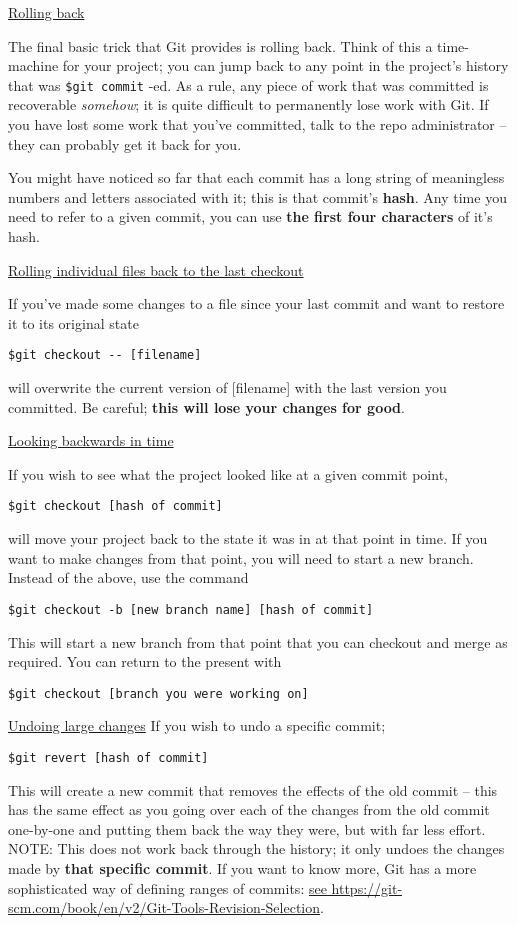 \documentclass[11pt, a4paper, english]{article}
\begin{document}
\underline{Rolling back}

The final basic trick that Git provides is rolling back. Think of this a time-machine for your project; you can jump back to any point in the project’s history that was \verb|$git commit| -ed. As a rule, any piece of work that was committed is recoverable \textit{somehow}; it is quite difficult to permanently lose work with Git. If you have lost some work that you’ve committed, talk to the repo administrator – they can probably get it back for you.

You might have noticed so far that each commit has a long string of meaningless numbers and letters associated with it; this is that commit's \textbf{hash}. Any time you need to refer to a given commit, you can use \textbf{the first four characters} of it's hash.

\underline{Rolling individual files back to the last checkout}

If you’ve made some changes to a file since your last commit and want to restore it to its original state
\begin{verbatim}
$git checkout -- [filename]
\end{verbatim}

will overwrite the current version of [filename] with the last version you committed. Be careful; \textbf{this will lose your changes for good}.

\underline{Looking backwards in time}

If you wish to see what the project looked like at a given commit point,
\begin{verbatim}
$git checkout [hash of commit]
\end{verbatim}
will move your project back to the state it was in at that point in time.
If you want to make changes from that point, you will need to start a new branch. Instead of the above, use the command
\begin{verbatim}
$git checkout -b [new branch name] [hash of commit]
\end{verbatim}
This will start a new branch from that point that you can checkout and merge as required.
You can return to the present with
\begin{verbatim}
$git checkout [branch you were working on]
\end{verbatim}

\underline{Undoing large changes}
If you wish to undo a specific commit;
\begin{verbatim}
$git revert [hash of commit]
\end{verbatim}
This will create a new commit that removes the effects of the old commit – this has the same effect as you going over each of the changes from the old commit one-by-one and putting them back the way they were, but with far less effort.
NOTE: This does not work back through the history; it only undoes the changes made by \textbf{that specific commit}. If you want to know more, Git has a more sophisticated way of defining ranges of commits: \url{see https://git-scm.com/book/en/v2/Git-Tools-Revision-Selection}.
\end{document}
